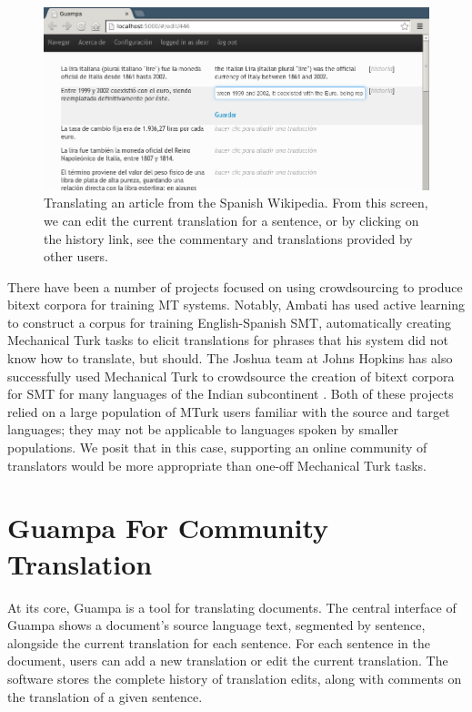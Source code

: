 \documentclass[10pt, a4paper]{article}
\begin{document}
\begin{figure}
\includegraphics[width=17.13cm]{guampa-edit-cropped}
\caption{Translating an article from the Spanish Wikipedia. From this screen,
we can edit the current translation for a sentence, or by clicking on the
history link, see the commentary and translations provided by other users.}
\end{figure}


There have been a number of projects focused on using crowdsourcing to produce
bitext corpora for training MT systems. Notably, Ambati
\cite{ambati_naacl,ambati_act} has used active learning to construct a corpus
for training English-Spanish SMT, automatically creating Mechanical Turk tasks
to elicit translations for phrases that his system did not know how to
translate, but should. The Joshua team at Johns Hopkins has also successfully
used Mechanical Turk to crowdsource the creation of bitext corpora for SMT for
many languages of the Indian subcontinent
\cite{post-callisonburch-osborne:2012:WMT}. Both of these projects relied on a
large population of MTurk users familiar with the source and target languages;
they may not be applicable to languages spoken by smaller populations. We posit
that in this case, supporting an online community of translators would be more
appropriate than one-off Mechanical Turk tasks.

\section{Guampa For Community Translation}
At its core, Guampa is a tool for translating documents. The central interface
of Guampa shows a document's source language text, segmented by sentence,
alongside the current translation for each sentence. For each sentence in the
document, users can add a new translation or edit the current translation. The
software stores the complete history of translation edits, along with comments
on the translation of a given sentence.
\end{document}
